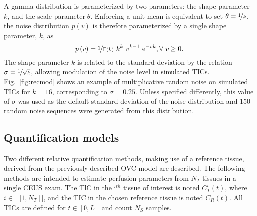 A gamma distribution is parameterized by two parameters: the shape parameter $k$, and the scale parameter $\theta$.
Enforcing a unit mean is equivalent to set $\theta = \nicefrac{1}{k}$, the noise distribution $p\left(v\right)$ is therefore parameterized by a single shape parameter, $k$, as
\begin{equation}
p\left(v\right) = \nicefrac{1}{\Gamma\left(k\right)} ~ k^k ~ v^{k-1} ~ \mathrm e^{-vk}, \forall~v \geq 0.
\end{equation}
The shape parameter $k$ is related to the standard deviation by the relation $\sigma = \nicefrac{1}{\sqrt{k}}$, allowing modulation of the noise level in simulated TICs.
Fig.~\ref{fig:recmod} shows an example of multiplicative random noise on simulated TICs for $k = 16$, corresponding to $\sigma = 0.25$.
Unless specified differently, this value of $\sigma$ was used as the default standard deviation of the noise distribution and 150 random noise sequences were generated from this distribution.

\subsection{Quantification models}
Two different relative quantification methods, making use of a reference tissue, derived from the previously described OVC model are described. 
The following methods are intended to estimate perfusion parameters from $N_T$ tissues in a single CEUS exam.
The TIC in the i$^{th}$ tissue of interest is noted $C_T^i(t)$, where $i \in \left[\![1,N_T \right]\!]$, and the TIC in the chosen reference tissue is noted $C_R(t)$. All TICs are defined for $t \in \left[ 0, L \right]$ and count $N_S$ samples.

